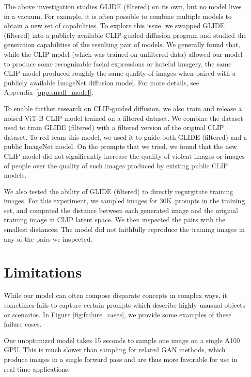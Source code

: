\documentclass{article}
\newcommand{\modelname}{GLIDE}
\begin{document}
The above investigation studies \modelname{} (filtered) on its own, but no model lives in a vacuum. For example, it is often possible to combine multiple models to obtain a new set of capabilities. To explore this issue, we swapped \modelname{} (filtered) into a publicly available CLIP-guided diffusion program \citep{clipdiff} and studied the generation capabilities of the resulting pair of models. We generally found that, while the CLIP model (which was trained on unfiltered data) allowed our model to produce some recognizable facial expressions or hateful imagery, the same CLIP model produced roughly the same quality of images when paired with a publicly available ImageNet diffusion model. For more details, see Appendix~\ref{app:small_model}.

To enable further research on CLIP-guided diffusion, we also train and release a noised ViT-B CLIP model trained on a filtered dataset. We combine the dataset used to train \modelname{} (filtered) with a filtered version of the original CLIP dataset. To red team this model, we used it to guide both \modelname{} (filtered) and a public  ImageNet model. On the prompts that we tried, we found that the new CLIP model did not significantly increase the quality of violent images or images of people over the quality of such images produced by existing public CLIP models.

We also tested the ability of \modelname{} (filtered) to directly regurgitate training images. For this experiment, we sampled images for 30K~prompts in the training set, and computed the distance between each generated image and the original training image in CLIP latent space. We then inspected the pairs with the smallest distances. The model did not faithfully reproduce the training images in any of the pairs we inspected.

\section{Limitations}
\label{sec:limitations}

While our model can often compose disparate concepts in complex ways, it sometimes fails to capture certain prompts which describe highly unusual objects or scenarios. In Figure \ref{fig:failure_cases}, we provide some examples of these failure cases.

Our unoptimized model takes 15 seconds to sample one image on a single A100 GPU. This is much slower than sampling for related GAN methods, which produce images in a single forward pass and are thus more favorable for use in real-time applications.
\end{document}
